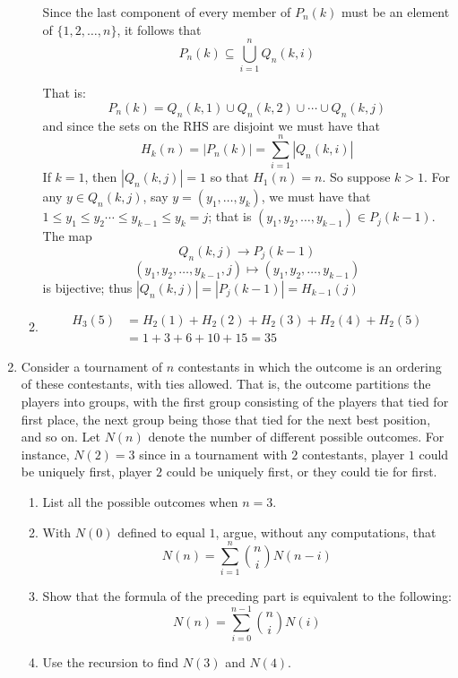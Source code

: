 \begin{enumerate}
\begin{enumerate}
Since the last component of every member of $P_n(k)$ must be an element of
$\{1, 2, \ldots, n\}$, it follows that
\[P_n(k) \subseteq \bigcup_{i=1}^nQ_n(k,i)\]

That is:
\[P_n(k) = Q_n(k,1) \cup Q_n(k,2) \cup \cdots \cup Q_n(k,j)\]
and since the sets on the RHS are disjoint we must have that
\[H_k(n) = |P_n(k)| = \sum_{i=1}^n|Q_n(k,i)|\]
If $k = 1$, then $|Q_n(k,j)| = 1$ so that $H_1(n) = n$. So suppose $k > 1$.
For any $y \in Q_n(k,j)$, say $y = (y_1, \ldots, y_k)$, we must have that
$1 \le y_1 \le y_2 \cdots \le y_{k-1} \le y_k = j$; that is
$(y_1, y_2,\ldots,y_{k-1}) \in P_j(k - 1)$. The map
\[Q_n(k,j) \rightarrow P_j(k - 1)\] 
\[(y_1, y_2,\ldots,y_{k-1}, j) \mapsto (y_1, y_2,\ldots,y_{k-1})\]
is bijective; thus $|Q_n(k,j)| = |P_j(k - 1)| = H_{k-1}(j)$

\item 
\begin{align*}
H_3(5) &= H_2(1) + H_2(2) + H_2(3) + H_2(4) + H_2(5) \\
&= 1 + 3 + 6 + 10 + 15 = 35
\end{align*}
\end{enumerate}

\item Consider a tournament of $n$ contestants in which the outcome is an
ordering of these contestants, with ties allowed. That is, the outcome 
partitions the players into groups, with the first group consisting of the 
players that tied for first place, the next group being those that tied for the
next best position, and so on. Let $N(n)$ denote the number of different 
possible outcomes. For instance, $N(2) = 3$ since in a tournament with $2$ 
contestants, player $1$ could be uniquely first, player $2$ could be uniquely 
first, or they could tie for first.

\begin{enumerate}
\item List all the possible outcomes when $n = 3$.
\item With $N(0)$ defined to equal $1$, argue, without any computations, that
\[N(n) = \sum_{i=1}^n\binom{n}{i}N(n - i)\]
\item Show that the formula of the preceding part is equivalent to the 
following:
\[N(n) = \sum_{i=0}^{n-1}\binom{n}{i}N(i)\]
\item Use the recursion to find $N(3)$ and $N(4)$.
\end{enumerate}


\end{enumerate}
